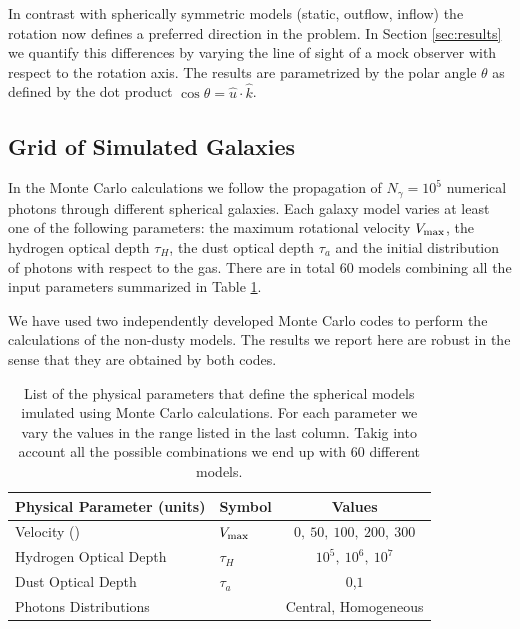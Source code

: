 \documentclass[usenatbib]{mn2e}
\newcommand{\kms}{{\ifmmode{{\mathrm{\,km\ s}^{-1}}}\else{\,km~s$^{-1}$}\fi}}
\begin{document}
In contrast with spherically symmetric models (static, outflow,
inflow) the rotation now defines a preferred direction in the
problem. In Section \ref{sec:results} we quantify this differences by
varying the line of sight of a mock observer with respect to the
rotation axis. The results are parametrized by the polar angle
$\theta$ as defined by the dot product $\cos\theta =
{\hat{u}\cdot\hat{k}}$. 

\subsection{Grid of Simulated Galaxies}
\label{sec:models}

In the Monte Carlo calculations we follow the propagation of $N_{\gamma}=10^5$
numerical photons through different spherical galaxies. Each galaxy
model varies at least one of the following parameters: the maximum
rotational velocity $V_{\rm max}$, the hydrogen optical depth $\tau_{H}$,
the dust optical depth $\tau_{a}$ and the initial distribution of photons
with respect to the gas. There are in total 60 models combining all
the input parameters summarized in Table \ref{table:models}. 


We have used two independently developed Monte Carlo codes
\citep{CLARA,DijkstraKramer} to perform the calculations of the
non-dusty models. The results we report here are robust in the sense
that they are obtained by both codes.

\begin{table}
\begin{center}
\begin{tabular}{llc}\hline\hline
Physical Parameter (units) & Symbol & Values\\\hline
Velocity (\kms) & $V_{\rm max}$&$0,\ 50,\ 100,\ 200,\ 300$\\
Hydrogen Optical Depth & $\tau_{H} $ & $10^{5},\ 10^{6},\ 10^{7}$\\
Dust Optical Depth & $\tau_{a}$ & $0$,$1$\\
Photons Distributions & & Central, Homogeneous\\\hline\hline
\end{tabular}
\caption{
  List of the physical parameters that define the spherical models 
  imulated using Monte Carlo calculations. For each parameter we
  vary the values in the range listed in the last column. Takig into
  account all the possible combinations we end up with $60$ different
  models. } 
\label{table:models}
\end{center}
\end{table}
\end{document}
